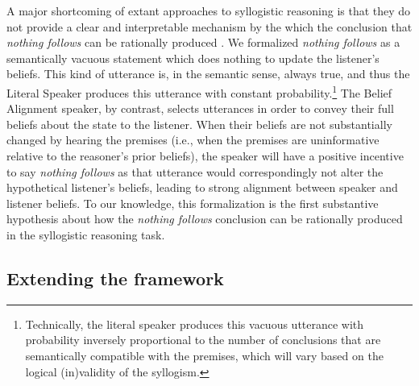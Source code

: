 \documentclass[floatsintext, man]{apa6}
\begin{document}
A major shortcoming of extant approaches to syllogistic reasoning is that they do not provide a clear and interpretable mechanism by the which the conclusion that \emph{nothing follows} can be rationally produced \cite{riesterer2020modeling}. 
We formalized \emph{nothing follows} as a semantically vacuous statement which does nothing to update the listener's beliefs. 
This kind of utterance is, in the semantic sense, always true, and thus the Literal Speaker produces this utterance with constant probability.\footnote{Technically, the literal speaker produces this vacuous utterance with probability inversely proportional to the number of conclusions that are semantically compatible with the premises, which will vary based on the logical (in)validity of the syllogism.}
The Belief Alignment speaker, by contrast, selects utterances in order to convey their full beliefs about the state to the listener. 
When their beliefs are not substantially changed by hearing the premises (i.e., when the premises are uninformative relative to the reasoner's prior beliefs), the speaker will have a positive incentive to say \emph{nothing follows} as that utterance would correspondingly not alter the hypothetical listener's beliefs, leading to strong alignment between speaker and listener beliefs. 
To our knowledge, this formalization is the first substantive hypothesis about how the \emph{nothing follows} conclusion can be rationally produced in the syllogistic reasoning task.

\subsection{Extending the framework}
\end{document}
